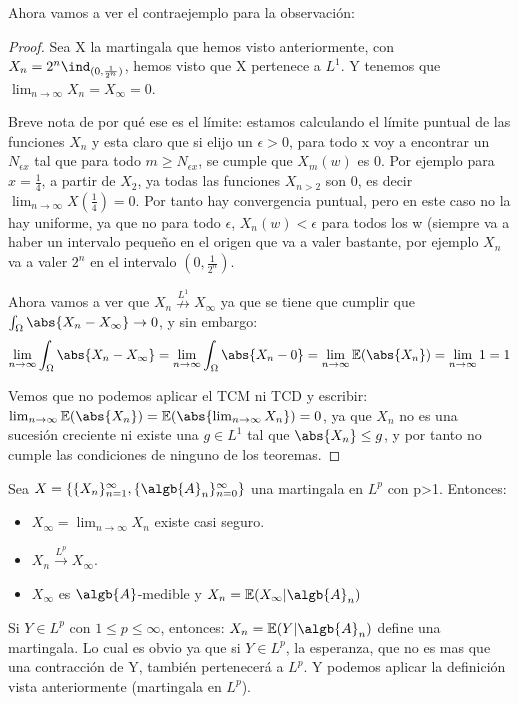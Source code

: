 \documentclass{apuntes}
\begin{document}
Ahora vamos a ver el contraejemplo para la observación:
\begin{proof}
Sea X la martingala que hemos visto anteriormente, con $X_n=  2^n \ind_{(0, \frac{1}{2^n})}$, hemos visto que X pertenece a $L^1$. Y tenemos que $\lim_{n \rightarrow \infty} X_n = X_{\infty} = 0$.

Breve nota de por qué ese es el límite: estamos calculando el límite puntual de las funciones $X_n$ y esta claro que si elijo un $\epsilon >0$, para todo x voy a encontrar un $N_{\epsilon x}$ tal que para todo $m \geq N_{\epsilon x}$, se cumple que $X_m(w)$ es 0. Por ejemplo para $x=\frac{1}{4}$, a partir de $X_2$, ya todas las funciones $X_{n>2}$ son 0, es decir $\lim_{n \rightarrow \infty} X(\frac{1}{4})=0$. Por tanto hay convergencia puntual, pero en este caso no la hay uniforme, ya que no para todo $\epsilon$, $X_n(w)<\epsilon$ para todos los w (siempre va a haber un intervalo pequeño en el origen que va a valer bastante, por ejemplo $X_n$ va a valer $2^n$ en el intervalo $(0, \frac{1}{2^n})$. 

Ahora vamos a ver que  $X_n \stackrel{L^1}{\nrightarrow} X_{\infty}$ ya que se tiene que cumplir que $\int_{\Omega} \abs{X_n - X_{\infty}} \rightarrow 0$, y sin embargo:
\[
\lim_{n \rightarrow \infty} \int_{\Omega} \abs{X_n - X_{\infty}} = \lim_{n \rightarrow \infty} \int_{\Omega} \abs{X_n - 0} = \lim_{n \rightarrow \infty} \mathbb{E}(\abs{X_n}) = \lim_{n \rightarrow \infty} 1 = 1
\]

Vemos que no podemos aplicar el TCM ni TCD y escribir: $\lim_{n \rightarrow \infty} \mathbb{E}(\abs{X_n}) =  \mathbb{E}(\abs{\lim_{n \rightarrow \infty} X_n}) = 0$, ya que $X_n$ no es una sucesión creciente ni existe una $g \in L^1$ tal que $\abs{X_n} \leq g$, y por tanto no cumple las condiciones de ninguno de los teoremas.

\end{proof}

\begin{theorem}

Sea $X=\{\{X_n\}_{n=1}^{\infty}, \{\algb{A}_n\}_{n=0}^{\infty}\}$ una martingala en $L^p$ con p>1. Entonces:
\begin{itemize}
\item $X_{\infty}=\lim_{n \rightarrow \infty} X_n$ existe casi seguro.
\item $X_n \stackrel{L^p}{\rightarrow} X_{\infty}$.

\item $X_{\infty}$ es $\algb{A}$-medible y $X_n=\mathbb{E}(X_{\infty}|\algb{A}_n)$ 
\end{itemize}
\obs Si $Y \in L^p$ con $1 \leq p \leq \infty$, entonces: $X_n= \mathbb{E}(Y|\algb{A}_n)$ define una martingala. Lo cual es obvio ya que si $Y \in L^p$, la esperanza, que no es mas que una contracción de Y, también pertenecerá a $L^p$. Y podemos aplicar la definición vista anteriormente (martingala en $L^p$).

\end{theorem}
\end{document}
